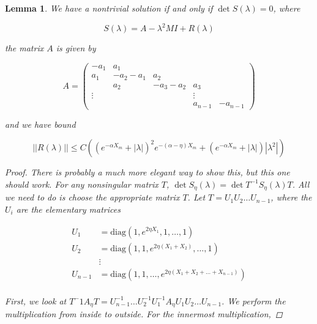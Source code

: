 \documentclass[12pt]{article}
\newtheorem{lemma}{Lemma}
\begin{document}

\begin{lemma}
We have a nontrivial solution if and only if $\det S(\lambda) = 0$, where

\[
S(\lambda) = A - \lambda^2 M I + R(\lambda)
\]

the matrix $A$ is given by

\begin{equation}\label{defA}
A = \begin{pmatrix}
-a_1 & a_1 \\
a_1 & -a_2 - a_1 & a_2 \\
& a_2 & -a_3 - a_2 & a_3 \\
\vdots & & & \vdots \\
& & & a_{n-1} & -a_{n-1} 
\end{pmatrix}
\end{equation}

and we have bound

\begin{equation}
||R(\lambda)|| \leq C 
\left( (e^{-\alpha X_m} + |\lambda|)^2 e^{-(\alpha - \eta)X_m}  
+ (e^{-\alpha X_m} + |\lambda| )|\lambda^2| \right)
\end{equation}

\begin{proof}
There is probably a much more elegant way to show this, but this one should work. For any nonsingular matrix $T$, $\det S_\eta(\lambda) = \det T^{-1} S_\eta(\lambda) T$. All we need to do is choose the appropriate matrix $T$. Let $T = U_1 U_2 \dots U_{n-1}$, where the $U_i$ are the elementary matrices

\begin{align*}
U_1 &= \text{diag}(1, e^{2 \eta X_1}, 1, \dots, 1) \\
U_2 &= \text{diag}(1, 1, e^{2 \eta (X_1 + X_2)}, \dots, 1) \\
&\vdots \\
U_{n-1} &= \text{diag}(1, 1, \dots, e^{2 \eta (X_1 + X_2 + \dots + X_{n-1})}) \\
\end{align*}

First, we look at $T^-1 A_\eta T = U_{n-1}^{-1} \dots U_2^{-1} U_1^{-1} A_\eta U_1 U_2 \dots U_{n-1}$. We perform the multiplication from inside to outside. For the innermost multiplication,


\end{proof}
\end{lemma}
\end{document}
